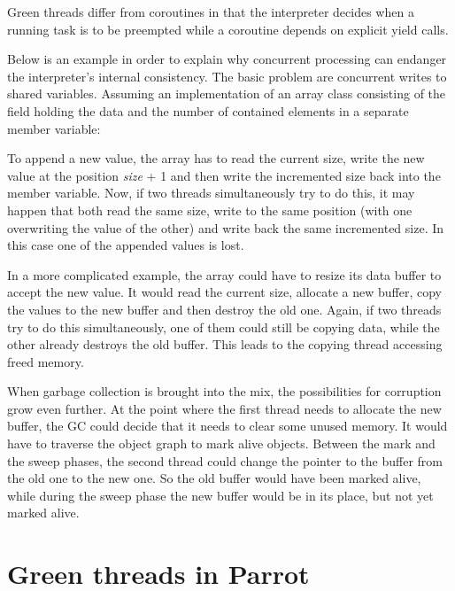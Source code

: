 \documentclass[bachelor,english]{hgbthesis}
\begin{document}
Green threads differ from coroutines in that the interpreter decides when a running task is to be preempted while a coroutine depends on explicit yield calls.

Below is an example in order to explain why concurrent processing can endanger the interpreter's internal consistency. The basic problem are concurrent writes to shared variables. Assuming an implementation of an array class consisting of the field holding the data and the number of contained elements in a separate member variable:
\begin{CCode}
pmclass ResizableIntegerArray auto_attrs provides array {
    ATTR INTVAL   size;      /* number of INTVALs stored in this array */
    ATTR INTVAL * int_array; /* INTVALs are stored here */
\end{CCode}
To append a new value, the array has to read the current size, write the new value at the position \textit{size} + 1 and then write the incremented size back into the member variable.
Now, if two threads simultaneously try to do this, it may happen that both read the same size, write to the same position (with one overwriting the value of the other) and write back the same incremented size. In this case one of the appended values is lost.

In a more complicated example, the array could have to resize its data buffer to accept the new value. It would read the current size, allocate a new buffer, copy the values to the new buffer and then destroy the old one. Again, if two threads try to do this simultaneously, one of them could still be copying data, while the other already destroys the old buffer. This leads to the copying thread accessing freed memory.

When garbage collection is brought into the mix, the possibilities for corruption grow even further. At the point where the first thread needs to allocate the new buffer, the GC could decide that it needs to clear some unused memory. It would have to traverse the object graph to mark alive objects. Between the mark and the sweep phases, the second thread could change the pointer to the buffer from the old one to the new one. So the old buffer would have been marked alive, while during the sweep phase the new buffer would be in its place, but not yet marked alive.

\section{Green threads in Parrot}
\end{document}
